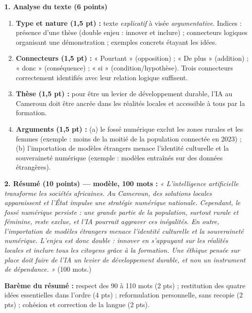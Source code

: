 \documentclass[11pt]{article}
\begin{document}
\begin{corrige}
\textbf{1. Analyse du texte (6 points)}
\begin{enumerate}
\item \textbf{Type et nature (1,5 pt) :} texte \emph{explicatif} à visée \emph{argumentative}. Indices : présence d'une thèse (double enjeu : innover et inclure) ; connecteurs logiques organisant une démonstration ; exemples concrets étayant les idées.
\item \textbf{Connecteurs (1,5 pt) :} « Pourtant » (opposition) ; « De plus » (addition) ; « donc » (conséquence) ; « si » (condition/hypothèse). Trois connecteurs correctement identifiés avec leur relation logique suffisent.
\item \textbf{Thèse (1,5 pt) :} pour être un levier de développement durable, l'IA au Cameroun doit être ancrée dans les réalités locales et accessible à tous par la formation.
\item \textbf{Arguments (1,5 pt) :} (a) le fossé numérique exclut les zones rurales et les femmes (exemple : moins de la moitié de la population connectée en 2023) ; (b) l'importation de modèles étrangers menace l'identité culturelle et la souveraineté numérique (exemple : modèles entraînés sur des données étrangères).
\end{enumerate}

\textbf{2. Résumé (10 points) — modèle, 100 mots :} \textit{« L'intelligence artificielle transforme les sociétés africaines. Au Cameroun, des solutions locales apparaissent et l'État impulse une stratégie numérique nationale. Cependant, le fossé numérique persiste : une grande partie de la population, surtout rurale et féminine, reste exclue, et l'IA pourrait aggraver ces inégalités. En outre, l'importation de modèles étrangers menace l'identité culturelle et la souveraineté numérique. L'enjeu est donc double : innover en s'appuyant sur les réalités locales et inclure tous les citoyens grâce à la formation. Une éthique pensée sur place doit faire de l'IA un levier de développement durable, et non un instrument de dépendance. »} (100 mots.)

\textbf{Barème du résumé :} respect des 90 à 110 mots (2 pts) ; restitution des quatre idées essentielles dans l'ordre (4 pts) ; reformulation personnelle, sans recopie (2 pts) ; cohésion et correction de la langue (2 pts).


\end{corrige}
\end{document}
